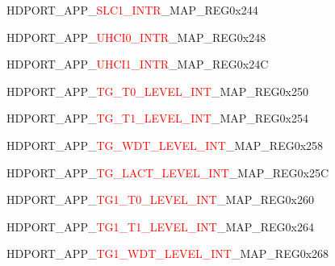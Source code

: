 \vspace{-3em}
\begin{register}{H}{DPORT\_APP\_\textcolor{red}{SLC1\_INTR}\_MAP\_REG}{0x244}\label{regdesc:APPSLC1INTRMAPREG}
\end{register}
\vspace{-3em}
\begin{register}{H}{DPORT\_APP\_\textcolor{red}{UHCI0\_INTR}\_MAP\_REG}{0x248}\label{regdesc:APPUHCI0INTRMAPREG}
\end{register}
\vspace{-3em}
\begin{register}{H}{DPORT\_APP\_\textcolor{red}{UHCI1\_INTR}\_MAP\_REG}{0x24C}\label{regdesc:APPUHCI1INTRMAPREG}
\end{register}
\vspace{-3em}
\begin{register}{H}{DPORT\_APP\_\textcolor{red}{TG\_T0\_LEVEL\_INT}\_MAP\_REG}{0x250}\label{regdesc:APPTGT0LEVELINTMAPREG}
\end{register}
\vspace{-3em}
\begin{register}{H}{DPORT\_APP\_\textcolor{red}{TG\_T1\_LEVEL\_INT}\_MAP\_REG}{0x254}\label{regdesc:APPTGT1LEVELINTMAPREG}
\end{register}
\vspace{-3em}
\begin{register}{H}{DPORT\_APP\_\textcolor{red}{TG\_WDT\_LEVEL\_INT}\_MAP\_REG}{0x258}\label{regdesc:APPTGWDTLEVELINTMAPREG}
\end{register}
\vspace{-3em}
\begin{register}{H}{DPORT\_APP\_\textcolor{red}{TG\_LACT\_LEVEL\_INT}\_MAP\_REG}{0x25C}\label{regdesc:APPTGLACTLEVELINTMAPREG}
\end{register}
\vspace{-3em}
\begin{register}{H}{DPORT\_APP\_\textcolor{red}{TG1\_T0\_LEVEL\_INT}\_MAP\_REG}{0x260}\label{regdesc:APPTG1T0LEVELINTMAPREG}
\end{register}
\vspace{-3em}
\begin{register}{H}{DPORT\_APP\_\textcolor{red}{TG1\_T1\_LEVEL\_INT}\_MAP\_REG}{0x264}\label{regdesc:APPTG1T1LEVELINTMAPREG}
\end{register}
\vspace{-3em}
\begin{register}{H}{DPORT\_APP\_\textcolor{red}{TG1\_WDT\_LEVEL\_INT}\_MAP\_REG}{0x268}\label{regdesc:APPTG1WDTLEVELINTMAPREG}
\end{register}
